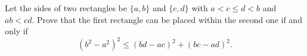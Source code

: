 Let the sides of two rectangles be $\{a, b\}$ and $\{c, d\}$ with $a < c \leq d < b$ and $ab < cd$. Prove that the first rectangle can be placed within the second one if and only if
\[ (b^2 - a^2)^2 \leq (bd - ac)^2 + (bc - ad)^2. \]
